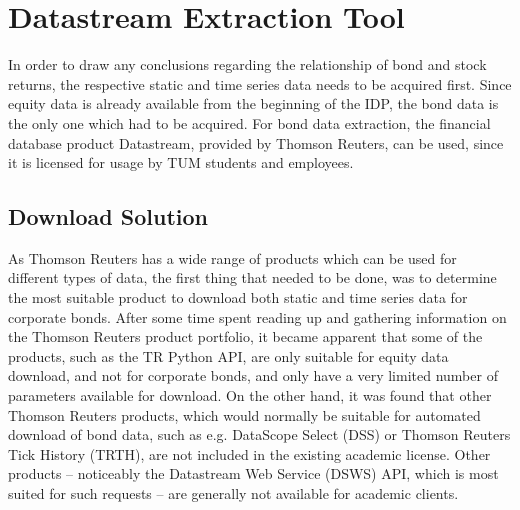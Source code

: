 \chapter{Datastream Extraction Tool} \label{chapter:datastream-extraction-tool}
In order to draw any conclusions regarding the relationship of bond and stock returns, the respective static and time series data needs to be acquired first. Since equity data is already available from the beginning of the IDP, the bond data is the only one which had to be acquired. For bond data extraction, the financial database product Datastream, provided by Thomson Reuters, can be used, since it is licensed for usage by TUM students and employees. 

\section{Download Solution} \label{section:download-solution}
As Thomson Reuters has a wide range of products which can be used for different types of data, the first thing that needed to be done, was to determine the most suitable product to download both static and time series data for corporate bonds. After some time spent reading up and gathering information on the Thomson Reuters product portfolio, it became apparent that some of the products, such as the TR Python API, are only suitable for equity data download, and not for corporate bonds, and only have a very limited number of parameters available for download. On the other hand, it was found that other Thomson Reuters products, which would normally be suitable for automated download of bond data, such as e.g. DataScope Select (DSS) or Thomson Reuters Tick History (TRTH), are not included in the existing academic license. Other products -- noticeably the Datastream Web Service (DSWS) API, which is most suited for such requests -- are generally not available for academic clients. 

